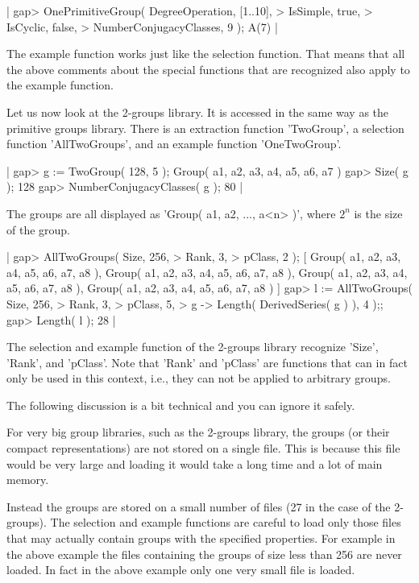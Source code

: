 |    gap> OnePrimitiveGroup( DegreeOperation,           [1..10],
    >                       IsSimple,                  true,
    >                       IsCyclic,                  false,
    >                       NumberConjugacyClasses,    9 );
    A(7) |

The example function works just like  the selection function.  That means
that  all  the  above  comments  about  the special  functions  that  are
recognized also apply to the example function.

Let us now look  at the 2-groups library.  It is accessed in the same way
as  the  primitive  groups  library.   There  is  an extraction  function
'TwoGroup', a selection function 'AllTwoGroups', and  an example function
'OneTwoGroup'.

|    gap> g := TwoGroup( 128, 5 );
    Group( a1, a2, a3, a4, a5, a6, a7 )
    gap> Size( g );
    128
    gap> NumberConjugacyClasses( g );
    80 |

The groups are all displayed as 'Group( a1, a2, ..., a<n> )', where $2^n$
is the size of the group.

|    gap> AllTwoGroups( Size,   256,
    >                  Rank,   3,
    >                  pClass, 2 );
    [ Group( a1, a2, a3, a4, a5, a6, a7, a8 ),
      Group( a1, a2, a3, a4, a5, a6, a7, a8 ),
      Group( a1, a2, a3, a4, a5, a6, a7, a8 ),
      Group( a1, a2, a3, a4, a5, a6, a7, a8 ) ]
    gap> l := AllTwoGroups( Size,                              256,
    >                       Rank,                              3,
    >                       pClass,                            5,
    >                       g -> Length( DerivedSeries( g ) ), 4 );;
    gap> Length( l );
    28 |

The  selection  and example  function  of the 2-groups  library recognize
'Size',  'Rank',  and  'pClass'.   Note  that  'Rank'  and  'pClass'  are
functions that can in fact only  be  used in this context, i.e., they can
not be applied to arbitrary groups.

The following discussion is a bit technical and you can ignore it safely.

For  very  big  group libraries, such as the 2-groups library, the groups
(or their compact representations) are not stored on a single file.  This
is because this file would be very large and loading it would take a long
time and a lot of main memory.

Instead the groups are stored on a small number of files (27  in the case
of the 2-groups).   The selection  and example  functions  are careful to
load only those files that may actually contain groups with the specified
properties.  For example in the  above example the  files containing  the
groups of  size  less than 256 are never  loaded.  In fact  in the  above
example only one very small file is loaded.

